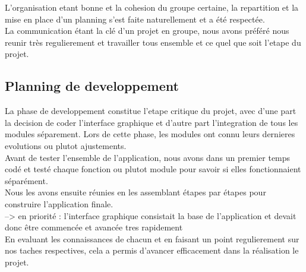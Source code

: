 \documentclass[a4]{article}
\begin{document}
		L'organisation etant bonne et la cohesion du groupe certaine, la repartition et la mise en place d'un planning 
		s'est faite naturellement et a été respectée.  \\
		La communication étant la clé d'un projet en groupe, nous avons préféré
		 nous reunir très regulierement et travailler tous ensemble et ce quel que soit l'etape du projet.
		\subsection{Planning de developpement}
		La phase de developpement constitue l’etape critique du projet, avec d’une part la decision de coder l’interface graphique
et d’autre part l’integration de tous les modules séparement. Lors de cette phase, les modules ont connu leurs dernieres evolutions ou plutot ajustements. \\
Avant de tester l’ensemble de l’application, nous avons dans un premier temps codé et
testé chaque fonction ou plutot module pour savoir si elles fonctionnaient séparément. \\
Nous les avons ensuite
réunies en les assemblant étapes par étapes pour construire l’application finale.  \\
--> en priorité : l'interface graphique consistait la base de l'application et devait donc être commencée et avancée tres rapidement \\
En evaluant les connaissances de chacun et en faisant un point regulierement sur nos taches respectives, cela a permis 
d'avancer efficacement dans la réalisation le projet.
\end{document}
